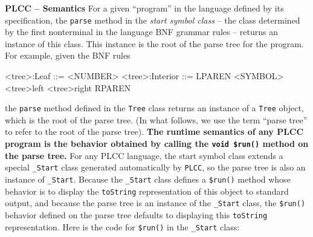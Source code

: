 \begin{minipage}[t]{\sw}
\slidenumber
\LARGE
{\bf PLCC -- Semantics}\exx
For a given ``program'' in the language defined by its specification,
the \verb'parse' method in the {\em start symbol class} --
the class determined by the first nonterminal
in the language BNF grammar rules --
returns an instance of this class.
This instance is the root of the parse tree for the program.
For example, given the BNF rules
{\Large
\begin{qv}
<tree>:Leaf     ::= <NUMBER>
<tree>:Interior ::= LPAREN <SYMBOL> <tree>left <tree>right RPAREN
\end{qv}
}
the \verb'parse' method defined in the \verb'Tree' class
returns an instance of a \verb'Tree' object,
which is the root of the parse tree.
(In what follows, we use the term ``parse tree''
to refer to the root of the parse tree).\exx
{\bf The runtime semantics of any PLCC program is the behavior
obtained by calling the \verb'void $run()' method
on the parse tree.}
For any PLCC language,
the start symbol class
extends a special \verb'_Start' class
generated automatically by \verb'PLCC',
so the parse tree is also an instance of \verb'_Start'.
Because the \verb'_Start' class defines a \verb'$run()' method
whose behavior is to display the \verb'toString' representation
of this object to standard output,
and because the parse tree is an instance of the \verb'_Start' class,
the \verb'$run()' behavior defined on the parse tree
defaults to displaying this \verb'toString' representation.
Here is the code for \verb'$run()' in the \verb'_Start' class:
{\Large
{}
}
\end{minipage}
\clearpage
